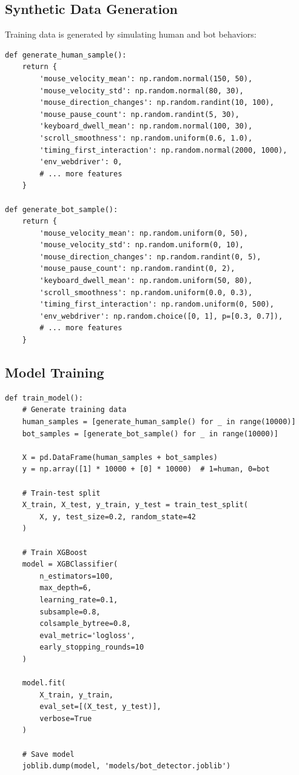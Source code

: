 \subsection{Synthetic Data Generation}

Training data is generated by simulating human and bot behaviors:

\begin{verbatim}
def generate_human_sample():
    return {
        'mouse_velocity_mean': np.random.normal(150, 50),
        'mouse_velocity_std': np.random.normal(80, 30),
        'mouse_direction_changes': np.random.randint(10, 100),
        'mouse_pause_count': np.random.randint(5, 30),
        'keyboard_dwell_mean': np.random.normal(100, 30),
        'scroll_smoothness': np.random.uniform(0.6, 1.0),
        'timing_first_interaction': np.random.normal(2000, 1000),
        'env_webdriver': 0,
        # ... more features
    }

def generate_bot_sample():
    return {
        'mouse_velocity_mean': np.random.uniform(0, 50),
        'mouse_velocity_std': np.random.uniform(0, 10),
        'mouse_direction_changes': np.random.randint(0, 5),
        'mouse_pause_count': np.random.randint(0, 2),
        'keyboard_dwell_mean': np.random.uniform(50, 80),
        'scroll_smoothness': np.random.uniform(0.0, 0.3),
        'timing_first_interaction': np.random.uniform(0, 500),
        'env_webdriver': np.random.choice([0, 1], p=[0.3, 0.7]),
        # ... more features
    }
\end{verbatim}

\subsection{Model Training}

\begin{verbatim}
def train_model():
    # Generate training data
    human_samples = [generate_human_sample() for _ in range(10000)]
    bot_samples = [generate_bot_sample() for _ in range(10000)]
    
    X = pd.DataFrame(human_samples + bot_samples)
    y = np.array([1] * 10000 + [0] * 10000)  # 1=human, 0=bot
    
    # Train-test split
    X_train, X_test, y_train, y_test = train_test_split(
        X, y, test_size=0.2, random_state=42
    )
    
    # Train XGBoost
    model = XGBClassifier(
        n_estimators=100,
        max_depth=6,
        learning_rate=0.1,
        subsample=0.8,
        colsample_bytree=0.8,
        eval_metric='logloss',
        early_stopping_rounds=10
    )
    
    model.fit(
        X_train, y_train,
        eval_set=[(X_test, y_test)],
        verbose=True
    )
    
    # Save model
    joblib.dump(model, 'models/bot_detector.joblib')
\end{verbatim}


